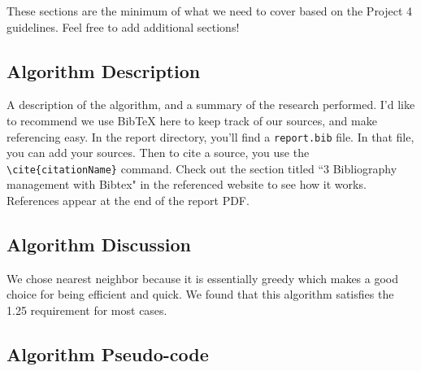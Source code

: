 \documentclass[../report/main.tex]{subfiles}
\begin{document}
These sections are the minimum of what we need to cover based on the Project 4 guidelines. Feel free to add additional sections!

\subsection*{Algorithm Description}

A description of the algorithm, and a summary of the research performed. I'd like to recommend we use BibTeX here to keep track of our sources, and make referencing easy. In the report directory, you'll find a \verb|report.bib| file. In that file, you can add your sources. Then to cite a source, you use the \verb|\cite{citationName}| command. Check out the section titled ``3 Bibliography management with Bibtex" in the referenced website to see how it works. \cite{bibtex} References appear at the end of the report PDF.

\subsection*{Algorithm Discussion}

We chose nearest neighbor because it is essentially greedy which makes a good choice for being efficient and quick. We found that this algorithm satisfies the 1.25 requirement for most cases.

\subsection*{Algorithm Pseudo-code}
\end{document}
